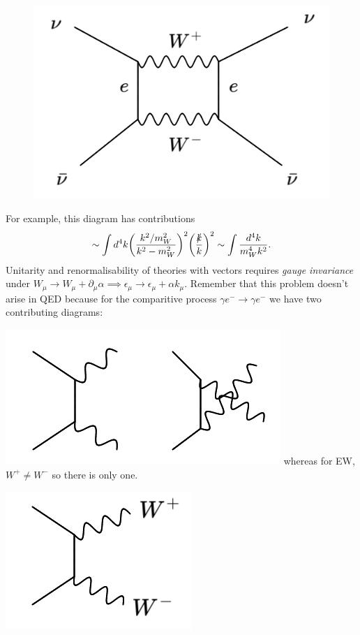 %
\begin{figure}
  \centering
  \includegraphics[width=\linewidth]{figs/18b.png}
\end{figure}
%
For example, this diagram has contributions
\begin{equation}
\sim \int d^4k \bigg(\frac{k^2/m_W^2}{k^2-m_W^2}\bigg)^2 \bigg(\frac{\slashed{k}}{k}\bigg)^2 \sim \int \frac{d^4k}{m_W^4k^2}.
\end{equation}
Unitarity and renormalisability of theories with vectors requires \textit{gauge invariance} under $W_\mu \to W_\mu + \partial_\mu \alpha \implies \epsilon_\mu \to \epsilon_\mu + \alpha k_\mu$. 
Remember that this problem doesn't arise in QED because for the comparitive process $\gamma e^- \to \gamma e^-$ we have two contributing diagrams:

%
  \includegraphics[width=\linewidth]{figs/18c.png}
%
\newline
whereas for EW, $W^+ \neq W^-$ so there is only one.

%
  \includegraphics[width=0.4\linewidth]{figs/18d.png}
%
